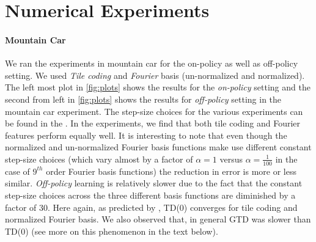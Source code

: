 \section{Numerical Experiments}
%
\paragraph{Mountain Car}   
We ran the experiments in mountain car for the on-policy as well as off-policy setting. We used \emph{Tile coding} and \emph{Fourier} basis (un-normalized and normalized). The left most plot in \cref{fig:plots} shows the results for the \emph{on-policy} setting and the second from left in \eqref{fig:plots} shows the results for \emph{off-policy} setting in the mountain car experiment. The step-size choices for the various experiments can be found in the . In the experiments, we find that both tile coding and Fourier features perform equally well. It is interesting to note that even though the normalized and un-normalized Fourier basis functions make use different constant step-size choices (which vary almost by a factor of $\alpha=1$ versus $\alpha=\frac1{100}$ in the case of $9^{th}$ order Fourier basis functions) the reduction in error is more or less similar. \emph{Off-policy} learning is relatively slower due to the fact that the constant step-size choices across the three different basis functions are diminished by a factor of $30$. Here again, as predicted by , TD(0) converges for tile coding and  normalized Fourier basis. We also observed that, in general GTD was slower than TD(0) (see more on this phenomenon in the text below).
\begin{table}
\label{tab:step-size}
\caption{step-size choices for the \emph{on/off}-policy settings in the mountain car experiment. The same step-size rule was followed for TD as well as GTD. Notice that these step-size choices directly follow from the results in  without any further tuning.}
\end{table}
%
